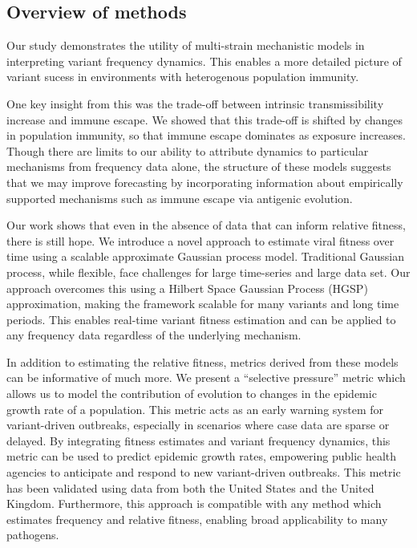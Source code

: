 \documentclass[12pt,oneside,letterpaper]{article}
\begin{document}

\subsection*{Overview of methods}

Our study demonstrates the utility of multi-strain mechanistic models in interpreting variant frequency dynamics.
This enables a more detailed picture of variant sucess in environments with heterogenous population immunity.

One key insight from this was the trade-off between intrinsic transmissibility increase and immune escape.
We showed that this trade-off is shifted by changes in population immunity, so that immune escape dominates as exposure increases.
Though there are limits to our ability to attribute dynamics to particular mechanisms from frequency data alone, the structure of these models suggests that we may improve forecasting by incorporating information about empirically supported mechanisms such as immune escape via antigenic evolution.

Our work shows that even in the absence of data that can inform relative fitness, there is still hope.
We introduce a novel approach to estimate viral fitness over time using a scalable approximate Gaussian process model.
Traditional Gaussian process, while flexible, face challenges for large time-series and large data set.
Our approach overcomes this using a Hilbert Space Gaussian Process (HGSP) approximation, making the framework scalable for many variants and long time periods.
This enables real-time variant fitness estimation and can be applied to any frequency data regardless of the underlying mechanism.

In addition to estimating the relative fitness, metrics derived from these models can be informative of much more.
We present a ``selective pressure'' metric which allows us to model the contribution of evolution to changes in the epidemic growth rate of a population.
This metric acts as an early warning system for variant-driven outbreaks, especially in scenarios where case data are sparse or delayed.
By integrating fitness estimates and variant frequency dynamics, this metric can be used to predict epidemic growth rates, empowering public health agencies to anticipate and respond to new variant-driven outbreaks.
This metric has been validated using data from both the United States and the United Kingdom.
Furthermore, this approach is compatible with any method which estimates frequency and relative fitness, enabling broad applicability to many pathogens.
\end{document}
